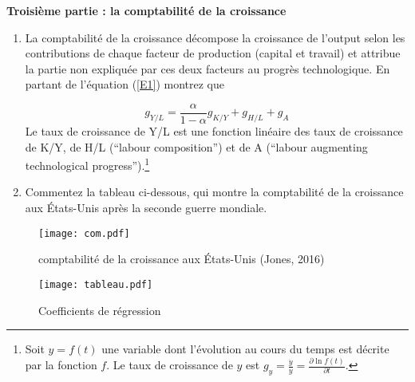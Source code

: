 \documentclass[a4paper,11pt]{article}
\begin{document}
\noindent \textbf{Troisi\`{e}me partie : la comptabilit\'{e} de la croissance}

\bigskip

\begin{enumerate}
\item La comptabilit\'{e} de la croissance d\'{e}compose
la croissance de l’output
selon les contributions de chaque facteur de production (capital et
travail) et attribue la partie non expliqu\'{e}e par ces deux facteurs au
progr\`{e}s technologique. En partant de l'équation (\ref{E1}) montrez que

\begin{equation}
    g_{Y/L}=\frac{\alpha}{1-\alpha} g_{K/Y} + g_{H/L} +g_A
\end{equation}
Le taux de croissance de Y/L est une fonction lin\'{e}aire des taux de
croissance de K/Y, de H/L (“labour composition”) et de A  (“labour augmenting technological progress”).\footnote{Soit  $y=f(t)$  une variable dont l’évolution au cours du temps est décrite par la fonction
$f$. Le taux de croissance de $y$ est $g_y=\frac{\dot{y}}{y}=\frac{\partial \ln f(t)}{\partial t}$.}

\item  Commentez la tableau ci-dessous, qui montre la comptabilit\'{e} de la croissance aux États-Unis après la seconde guerre mondiale.
\end{enumerate}

\begin{figure}[th]
\centering
\texttt{[image: com.pdf]}
\caption{comptabilit\'{e} de la croissance aux États-Unis (Jones, 2016)}
\label{fig:1.5}
\end{figure}


\newpage


\bigskip

\begin{figure}[th]
\centering
\texttt{[image: tableau.pdf]}
\caption{Coefficients de r\'{e}gression}
\label{fig:1.4}
\end{figure}
\end{document}
